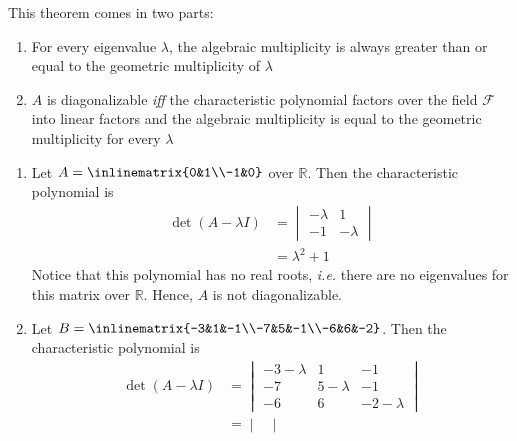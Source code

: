 \begin{thm}\label{thm-algebraic-geometric-multiplicity}
	This theorem comes in two parts:
	\begin{enumerate}
		\item For every eigenvalue $\lambda$, the algebraic multiplicity is always
		      greater than or equal to the geometric multiplicity of $\lambda$
		\item $A$ is diagonalizable \textit{iff} the characteristic polynomial factors
		      over the field $\mathcal{F}$ into linear factors and the algebraic multiplicity
		      is equal to the geometric multiplicity for every $\lambda$
	\end{enumerate}
\end{thm}

\begin{exm}\label{exm-not-diagonalizable}
	\hfill
	\begin{enumerate}
		\item Let $A=\inlinematrix{0&1\\-1&0}$ over $\mathbb{R}$.
		      Then the characteristic polynomial is
		      \begin{align*}
			      \det(A - \lambda I) & = \begin{vmatrix}
				      -\lambda & 1        \\
				      -1       & -\lambda
			      \end{vmatrix} \\
			                          & = \lambda^2 + 1
		      \end{align*}
		      Notice that this polynomial has no real roots, \textit{i.e.} there are no eigenvalues
		      for this matrix over $\mathbb{R}$. Hence, $A$ is not diagonalizable.
		\item Let $B=\inlinematrix{-3&1&-1\\-7&5&-1\\-6&6&-2}$.
		      Then the characteristic polynomial is
		      \begin{align*}
			      \det(A - \lambda I) & = \begin{vmatrix}
				      -3-\lambda & 1         & -1         \\
				      -7         & 5-\lambda & -1         \\
				      -6         & 6         & -2-\lambda
			      \end{vmatrix}                                                   \\
			                          & = \begin{vmatrix}

\end{vmatrix}
\end{align*}
\end{enumerate}
\end{exm}
